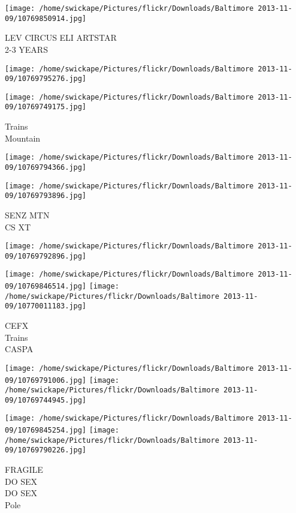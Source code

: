 \documentclass[10pt,letterpaper]{article}
\begin{document}
\vspace{0.25in}
\texttt{[image: /home/swickape/Pictures/flickr/Downloads/Baltimore 2013-11-09/10769850914.jpg]}

LEV CIRCUS ELI ARTSTAR\\
2{-}3 YEARS
\pagebreak

\texttt{[image: /home/swickape/Pictures/flickr/Downloads/Baltimore 2013-11-09/10769795276.jpg]}

\vspace{0.25in}
\texttt{[image: /home/swickape/Pictures/flickr/Downloads/Baltimore 2013-11-09/10769749175.jpg]}

Trains\\
Mountain
\pagebreak

\texttt{[image: /home/swickape/Pictures/flickr/Downloads/Baltimore 2013-11-09/10769794366.jpg]}

\vspace{0.25in}
\texttt{[image: /home/swickape/Pictures/flickr/Downloads/Baltimore 2013-11-09/10769793896.jpg]}

SENZ MTN\\
CS XT
\pagebreak

\texttt{[image: /home/swickape/Pictures/flickr/Downloads/Baltimore 2013-11-09/10769792896.jpg]}

\vspace{0.25in}
\texttt{[image: /home/swickape/Pictures/flickr/Downloads/Baltimore 2013-11-09/10769846514.jpg]}
\texttt{[image: /home/swickape/Pictures/flickr/Downloads/Baltimore 2013-11-09/10770011183.jpg]}

CEFX\\
Trains\\
CASPA
\pagebreak

\texttt{[image: /home/swickape/Pictures/flickr/Downloads/Baltimore 2013-11-09/10769791006.jpg]}
\texttt{[image: /home/swickape/Pictures/flickr/Downloads/Baltimore 2013-11-09/10769744945.jpg]}

\texttt{[image: /home/swickape/Pictures/flickr/Downloads/Baltimore 2013-11-09/10769845254.jpg]}
\texttt{[image: /home/swickape/Pictures/flickr/Downloads/Baltimore 2013-11-09/10769790226.jpg]}

FRAGILE\\
DO SEX\\
DO SEX\\
Pole
\pagebreak
\end{document}
